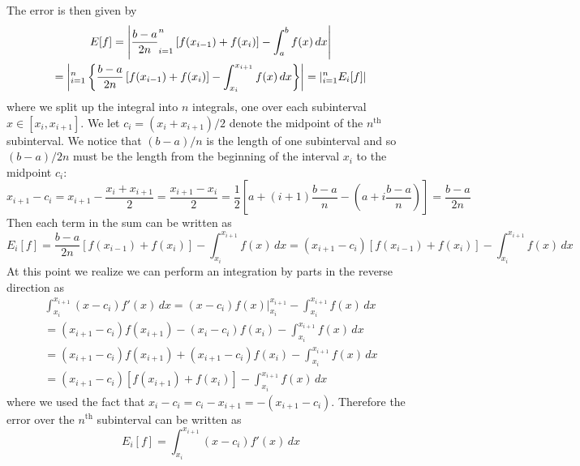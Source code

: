 \documentclass[11pt]{article}
\let\sumop\relax
\begin{document}
The error is then given by
\begin{multline*}
  E[f] = \left\lvert \frac{b-a}{2n} \sumop_{i=1}^n \left[ f(x_{i-1}) + f(x_i) \right] - \int_a^b f(x) \, dx \right\rvert \\
  = \left\lvert \sumop_{i=1}^n \left\{ \frac{b-a}{2n} \left[ f(x_{i-1}) + f(x_i) \right] - \int_{x_i}^{x_{i+1}} f(x) \, dx \right\} \right\rvert
  = \left\lvert \sumop_{i=1}^n E_i[f] \right\rvert
\end{multline*}
where we split up the integral into $n$ integrals, one over each subinterval $x \in [x_{i}, x_{i+1}]$. We let $c_i = (x_{i} + x_{i+1})/2$ denote the midpoint of the $n^\mathrm{th}$ subinterval. We notice that $(b-a)/n$ is the length of one subinterval and so $(b-a)/2n$ must be the length from the beginning of the interval $x_i$ to the midpoint $c_i$:
\begin{equation*}
  x_{i+1} - c_i = x_{i+1} - \frac{x_{i} + x_{i+1}}{2} = \frac{x_{i+1} - x_i}{2}
  = \frac{1}{2} \left[ a + (i+1)\frac{b-a}{n} - \left( a + i\frac{b-a}{n} \right) \right]
  = \frac{b-a}{2n}
\end{equation*}
Then each term in the sum can be written as
\begin{equation*}
  E_i[f]
  = \frac{b-a}{2n} \left[ f(x_{i-1}) + f(x_i) \right] - \int_{x_i}^{x_{i+1}} f(x) \, dx
  = (x_{i+1} - c_i) \left[ f(x_{i-1}) + f(x_i) \right] - \int_{x_i}^{x_{i+1}} f(x) \, dx
\end{equation*}
At this point we realize we can perform an integration by parts in the reverse direction as 
\begin{multline*}
  \int_{x_i}^{x_{i+1}} (x-c_i) f'(x) \, dx
  = (x-c_i)f(x) \Big\rvert_{x_i}^{x_{i+1}} - \int_{x_i}^{x_{i+1}} f(x) \, dx \\
  = (x_{i+1}-c_i)f(x_{i+1}) - (x_i-c_i)f(x_i) - \int_{x_i}^{x_{i+1}} f(x) \, dx \\
  = (x_{i+1}-c_i)f(x_{i+1}) + (x_{i+1}-c_i)f(x_i) - \int_{x_i}^{x_{i+1}} f(x) \, dx \\
  = (x_{i+1}-c_i)\left[ f(x_{i+1}) + f(x_i) \right] - \int_{x_i}^{x_{i+1}} f(x) \, dx
\end{multline*}
where we used the fact that $x_i - c_i = c_i - x_{i+1} = - (x_{i+1} - c_i)$. Therefore the error over the $n^\mathrm{th}$ subinterval can be written as
\begin{equation*}
  E_i[f] = \int_{x_i}^{x_{i+1}} (x-c_i) f'(x) \, dx
\end{equation*}
\end{document}
